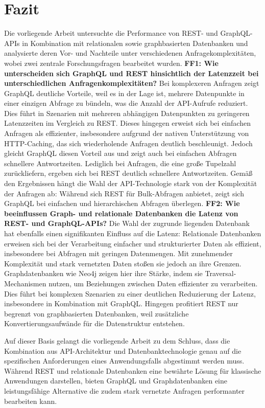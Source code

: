 \chapter{Fazit} %
\label{sec:fazit}
Die vorliegende Arbeit untersuchte die Performance von REST- und GraphQL-APIs in Kombination mit relationalen sowie graphbasierten Datenbanken und analysierte deren Vor- und Nachteile unter verschiedenen Anfragekomplexitäten, wobei zwei zentrale Forschungsfragen bearbeitet wurden.
\newline
\noindent
\textbf{FF1: Wie unterscheiden sich GraphQL und REST hinsichtlich der Latenzzeit bei unterschiedlichen Anfragenkomplexitäten?}
Bei komplexeren Anfragen zeigt GraphQL deutliche Vorteile, weil es in der Lage ist, mehrere Datenpunkte in einer einzigen Abfrage zu bündeln, was die Anzahl der API-Aufrufe reduziert. Dies führt in Szenarien mit mehreren abhängigen Datenpunkten zu geringeren Latenzzeiten im Vergleich zu REST. Dieses hingegen erweist sich bei einfachen Anfragen als effizienter, insbesondere aufgrund der nativen Unterstützung von HTTP-Caching, das sich wiederholende Anfragen deutlich beschleunigt. Jedoch gleicht GraphQL diesen Vorteil aus und zeigt auch bei einfachen Abfragen schnellere Antwortzeiten. Lediglich bei Anfragen, die eine große Tupelzahl zurückliefern, ergeben sich bei REST deutlich schnellere Antwortzeiten. Gemäß den Ergebnissen hängt die Wahl der API-Technologie stark von der Komplexität der Anfragen ab: Während sich REST für Bulk-Abfragen anbietet, zeigt sich GraphQL bei einfachen und hierarchischen Abfragen überlegen. 
\newline
\noindent
\textbf{FF2: Wie beeinflussen Graph- und relationale Datenbanken die Latenz von REST- und GraphQL-APIs?}
Die Wahl der zugrunde liegenden Datenbank hat ebenfalls einen signifikanten Einfluss auf die Latenz: Relationale Datenbanken erweisen sich bei der Verarbeitung einfacher und strukturierter Daten als effizient, insbesondere bei Abfragen mit geringen Datenmengen. Mit zunehmender Komplexität und stark vernetzten Daten stoßen sie jedoch an ihre Grenzen. Graphdatenbanken wie Neo4j zeigen hier ihre Stärke, indem sie Traversal-Mechanismen nutzen, um Beziehungen zwischen Daten effizienter zu verarbeiten. Dies führt bei komplexen Szenarien zu einer deutlichen Reduzierung der Latenz, insbesondere in Kombination mit GraphQL. Hingegen profitiert REST nur begrenzt von graphbasierten Datenbanken, weil zusätzliche Konvertierungsaufwände für die Datenstruktur entstehen.

\vspace{1em} 
\noindent
Auf dieser Basis gelangt die vorliegende Arbeit zu dem Schluss, dass die Kombination aus API-Architektur und Datenbanktechnologie genau auf die spezifischen Anforderungen eines Anwendungsfalls abgestimmt werden muss. Während REST und relationale Datenbanken eine bewährte Lösung für klassische Anwendungen darstellen, bieten GraphQL und Graphdatenbanken eine leistungsfähige Alternative die zudem stark vernetzte Anfragen performanter bearbeiten kann.




